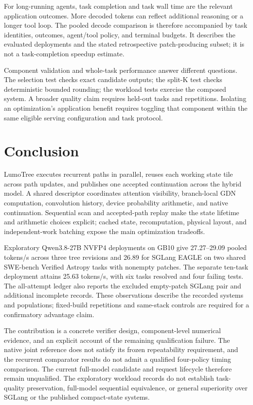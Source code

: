 \documentclass[conference]{IEEEtran}
\newcommand{\sys}{LumoTree}
\begin{document}
For long-running agents, task completion and task wall time are the relevant application outcomes. More decoded tokens can reflect additional reasoning or a longer tool loop. The pooled decode comparison is therefore accompanied by task identities, outcomes, agent/tool policy, and terminal budgets. It describes the evaluated deployments and the stated retrospective patch-producing subset; it is not a task-completion speedup estimate.

Component validation and whole-task performance answer different questions. The selection test checks exact candidate outputs; the split-K test checks deterministic bounded rounding; the workload tests exercise the composed system. A broader quality claim requires held-out tasks and repetitions. Isolating an optimization's application benefit requires toggling that component within the same eligible serving configuration and task protocol.

\section{Conclusion}
\sys{} executes recurrent paths in parallel, reuses each working state tile across path updates, and publishes one accepted continuation across the hybrid model. A shared descriptor coordinates attention visibility, branch-local GDN computation, convolution history, device probability arithmetic, and native continuation. Sequential scan and accepted-path replay make the state lifetime and arithmetic choices explicit; cached state, recomputation, physical layout, and independent-work batching expose the main optimization tradeoffs.

Exploratory Qwen3.8-27B NVFP4 deployments on GB10 give 27.27--29.09 pooled tokens/s across three tree revisions and 26.89 for SGLang EAGLE on two shared SWE-bench Verified Astropy tasks with nonempty patches. The separate ten-task deployment attains 25.63 tokens/s, with six tasks resolved and four failing tests. The all-attempt ledger also reports the excluded empty-patch SGLang pair and additional incomplete records. These observations describe the recorded systems and populations; fixed-build repetitions and same-stack controls are required for a confirmatory advantage claim.

The contribution is a concrete verifier design, component-level numerical evidence, and an explicit account of the remaining qualification failure. The native joint reference does not satisfy its frozen repeatability requirement, and the recurrent comparator results do not admit a qualified four-policy timing comparison. The current full-model candidate and request lifecycle therefore remain unqualified. The exploratory workload records do not establish task-quality preservation, full-model sequential equivalence, or general superiority over SGLang or the published compact-state systems.
\end{document}
